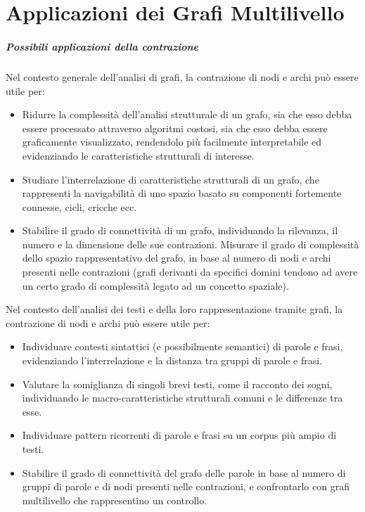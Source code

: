 \chapter{Applicazioni dei Grafi Multilivello}

\paragraph{Possibili applicazioni della contrazione}
Nel contesto generale dell'analisi di grafi, la contrazione di nodi e archi pu\`o essere utile per:
\begin{itemize}
    \item Ridurre la complessit\`a dell'analisi strutturale di un grafo, sia che esso debba essere processato
    attraverso algoritmi costosi, sia che esso debba essere graficamente visualizzato, rendendolo pi\`u facilmente
    interpretabile ed evidenziando le caratteristiche strutturali di interesse.
    \item Studiare l'interrelazione di caratteristiche strutturali di un grafo, che rappresenti la navigabilit\`a
    di uno spazio basato su componenti fortemente connesse, cicli, cricche ecc.
    \item Stabilire il grado di connettivit\`a di un grafo, individuando la rilevanza, il numero e la dimensione
    delle sue contrazioni.
    Misurare il grado di complessit\`a dello spazio rappresentativo del grafo, in base al numero
    di nodi e archi presenti nelle contrazioni (grafi derivanti da specifici domini tendono ad avere un certo grado
    di complessit\`a legato ad un concetto spaziale).
\end{itemize}

Nel contesto dell'analisi dei testi e della loro rappresentazione tramite grafi, la contrazione di nodi e archi
pu\`o essere utile per:
\begin{itemize}
    \item Individuare contesti sintattici (e possibilmente semantici) di parole e frasi, evidenziando l'interrelazione
    e la distanza tra gruppi di parole e frasi.
    \item Valutare la somiglianza di singoli brevi testi, come il racconto dei sogni, individuando le
    macro-caratteristiche strutturali comuni e le differenze tra esse.
    \item Individuare pattern ricorrenti di parole e frasi su un corpus pi\`u ampio di testi.
    \item Stabilire il grado di connettivit\`a del grafo delle parole in base al numero di gruppi di parole e di nodi
    presenti nelle contrazioni, e confrontarlo con grafi multilivello che rappresentino un controllo.
\end{itemize}
